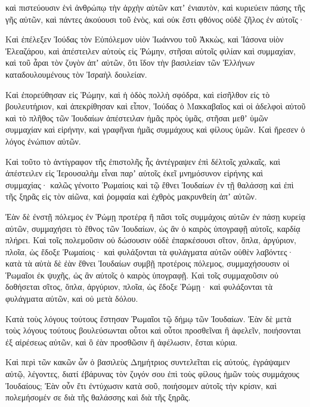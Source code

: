 {καὶ πιστεύουσιν ἑνὶ ἀνθρώπῳ τὴν ἀρχὴν αὐτῶν κατʼ ἐνιαυτὸν, καὶ κυριεύειν πάσης τῆς γῆς αὐτῶν, καὶ πάντες ἀκούουσι τοῦ ἑνὸς, καὶ οὐκ ἔστι φθόνος οὐδὲ ζῆλος ἐν αὐτοῖς·
\par }{\PP {}Καὶ ἐπέλεξεν Ἰούδας τὸν Εὐπόλεμον υἱὸν Ἰωάννου τοῦ Ἀκκὼς, καὶ Ἰάσονα υἱὸν Ἐλεαζάρου, καὶ ἀπέστειλεν αὐτοὺς εἰς Ῥώμην, στῆσαι αὐτοῖς φιλίαν καὶ συμμαχίαν,
καὶ τοῦ ἆραι τὸν ζυγὸν ἀπʼ αὐτῶν, ὅτι ἴδον τὴν βασιλείαν τῶν Ἑλλήνων καταδουλουμένους τὸν Ἰσραὴλ δουλείαν.
\par }{\PP {}Καὶ ἐπορεύθησαν εἰς Ῥώμην, καὶ ἡ ὁδὸς πολλὴ σφόδρα, καὶ εἰσῆλθον εἰς τὸ βουλευτήριον, καὶ ἀπεκρίθησαν καὶ εἶπον,
Ἰούδας ὁ Μακκαβαῖος καὶ οἱ ἀδελφοὶ αὐτοῦ καὶ τὸ πλῆθος τῶν Ἰουδαίων ἀπέστειλαν ἡμᾶς πρὸς ὑμᾶς, στῆσαι μεθʼ ὑμῶν συμμαχίαν καὶ εἰρήνην, καὶ γραφῆναι ἡμᾶς συμμάχους καὶ φίλους ὑμῶν.
Καὶ ἤρεσεν ὁ λόγος ἐνώπιον αὐτῶν.
\par }{\PP {}Καὶ τοῦτο τὸ ἀντίγραφον τῆς ἐπιστολῆς ἧς ἀντέγραψεν ἐπὶ δέλτοῖς χαλκαῖς, καὶ ἀπέστειλεν εἰς Ἱερουσαλὴμ εἶναι παρʼ αὐτοῖς ἐκεῖ μνημόσυνον εἰρήνης καὶ συμμαχίας·
καλῶς γένοιτο Ῥωμαίοις καὶ τῷ ἔθνει Ἰουδαίων ἐν τῇ θαλάσσῃ καὶ ἐπὶ τῆς ξηρᾶς εἰς τὸν αἰῶνα, καὶ ῥομφαία καὶ ἐχθρὸς μακρυνθείη ἀπʼ αὐτῶν.
\par }{\PP {}Ἐὰν δὲ ἐνστῇ πόλεμος ἐν Ῥώμῃ προτέρᾳ ἢ πᾶσι τοῖς συμμάχοις αὐτῶν ἐν πάσῃ κυρείᾳ αὐτῶν,
συμμαχήσει τὸ ἔθνος τῶν Ἰουδαίων, ὡς ἂν ὁ καιρὸς ὑπογραφῇ αὐτοῖς, καρδίᾳ πλήρει.
Καὶ τοῖς πολεμοῦσιν οὐ δώσουσιν οὐδὲ ἐπαρκέσουσι σῖτον, ὅπλα, ἀργύριον, πλοῖα, ὡς ἔδοξε Ῥωμαίοις· καὶ φυλάξονται τὰ φυλάγματα αὐτῶν οὐθὲν λαβόντες·
κατὰ τὰ αὐτὰ δὲ ἐὰν ἔθνει Ἰουδαίων συμβῇ προτέροις πόλεμος, συμμαχήσουσιν οἱ Ῥωμαῖοι ἐκ ψυχῆς, ὡς ἂν αὐτοῖς ὁ καιρὸς ὑπογραφῇ.
Καὶ τοῖς συμμαχοῦσιν οὐ δοθήσεται σῖτος, ὅπλα, ἀργύριον, πλοῖα, ὡς ἔδοξε Ῥώμῃ· καὶ φυλάξονται τὰ φυλάγματα αὐτῶν, καὶ οὐ μετὰ δόλου.
\par }{\PP {}Κατὰ τοὺς λόγους τούτους ἔστησαν Ῥωμαῖοι τῷ δήμῳ τῶν Ἰουδαίων.
Ἐὰν δὲ μετὰ τοὺς λόγους τούτους βουλεύσωνται οὗτοι καὶ οὗτοι προσθεῖναι ἢ ἀφελεῖν, ποιήσονται ἐξ αἱρέσεως αὐτῶν, καὶ ὃ ἐὰν προσθῶσιν ἢ ἀφέλωσιν, ἔσται κύρια.
\par }{\PP {}Καὶ περὶ τῶν κακῶν ὧν ὁ βασιλεὺς Δημήτριος συντελεῖται εἰς αὐτούς, ἐγράψαμεν αὐτῷ, λέγοντες, διατί ἐβάρυνας τὸν ζυγόν σου ἐπὶ τοὺς φίλους ἡμῶν τοὺς συμμάχους Ἰουδαίους;
Ἐὰν οὖν ἔτι ἐντύχωσιν κατὰ σοῦ, ποιήσομεν αὐτοῖς τὴν κρίσιν, καὶ πολεμήσομέν σε διὰ τῆς θαλάσσης καὶ διὰ τῆς ξηρᾶς.

}
